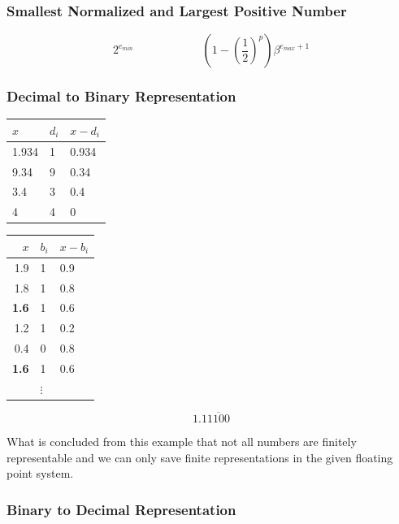 \documentclass[10pt,a4paper]{scrartcl}
\begin{document}
\begin{multicols*}{2}
\subsubsection{Smallest Normalized and Largest Positive Number}
\label{sec:SmallestNormalizedAndLargestPositiveNumber}

\[2^{e_{min}}\qquad\qquad\qquad\left(1-\left(\frac{1}{2}\right)^p\right)\beta^{e_{max}+1}\]

\subsubsection{Decimal to Binary Representation}
\label{sec:DecimalToBinaryRepresentationFloat}

\begin{minipage}{0.45\linewidth}
\begin{center}
\begin{tabular}{l|l|l}
$x$&$d_i$&$x-d_i$\\\hline
1.934&1&0.934\\
9.34&9&0.34\\
3.4&3&0.4\\
4&4&0
\end{tabular}
\end{center}
\end{minipage}
\hfill
\begin{minipage}{0.45\linewidth}
\begin{center}

\begin{tabular}{r|l|l}
$x$&$b_i$&$x-b_i$\\\hline
1.9&1&0.9\\
1.8&1&0.8\\
\textbf{1.6}&1&0.6\\
1.2&1&0.2\\
0.4&0&0.8\\
\textbf{1.6}&1&0.6\\
&$\vdots$&
\end{tabular}
\end{center}
\begin{equation*}
1.1\overline{1100}
\end{equation*}
\end{minipage}

What is concluded from this example that not all numbers are finitely representable and we can only save finite representations in the given floating point system.

\subsubsection{Binary to Decimal Representation}
\label{sec:BinaryToDecimalRepresentationFloat}


\end{multicols*}
\end{document}
